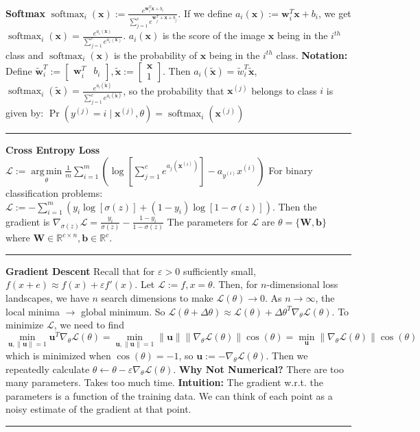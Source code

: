 \documentclass{article}
\newcommand{\R}{\mathbb{R}}
\newcommand{\x}{\bf{x}}
\newcommand{\w}{\bf{w}}
\renewcommand{\u}{\bf{u}}
\renewcommand{\b}{\bf{b}}
\newcommand{\W}{\bf{W}}
\newcommand{\ot}{\leftarrow}
\renewcommand{\bf}[1]{\textbf{{#1}}}
\newcommand{\grad}[2]{\nabla_{#1}{#2}}
\newcommand{\eps}{\varepsilon}
\renewcommand{\L}{\mathcal{L}}
\DeclareMathOperator*{\argmin}{arg\,min}
\DeclareMathOperator*{\sm}{softmax}
\begin{document}
\begin{small}
\newpage
\bf{Softmax}
\newline
$\sm_{i} (\x) := \frac{e^{\w_i^T \x + b_i}}{\sum_{j = 1}^{c} e^{\w_j^T + \x + b_j}}$. If we define
$a_i (\x) := \w_i^T \x + b_i$, we get $\sm_i (\x) = \frac{e^{a_i (\x)}}{\sum_{j = 1}^{c} e^{a_i (\x)}}$.
$a_i (\x)$ is the score of the image $\x$ being in the $i^{th}$ class and $\sm_{i} (\x)$ is the
probability of $\x$ being in the $i^{th}$ class.
\vspace{-0.5em}
\newline
\bf{Notation:} Define 
$
\widetilde{\w}_i^T := 
\begin{bmatrix}
    \w_i^T & b_i
\end{bmatrix}
,
\widetilde{\x} := 
\begin{bmatrix}
    \x \\ 1
\end{bmatrix}
$. Then $a_i (\widetilde{\x}) = \widetilde{w}_i^T \widetilde{\x}$, 
$\sm_i (\widetilde{\x}) = \frac{e^{a_i (\widetilde{\x})}}{\sum_{j = 1}^{c} e^{a_i (\widetilde{\x})}}$,
so the probability that $\x^{(j)}$ belongs to class $i$ is given by:
$\Pr(y^{(j)} = i \mid \x^{(j)}, \theta) = \sm_{i} (\x^{(j)})$
\hrule
\vspace{0.1em}

\bf{Cross Entropy Loss}
\newline
$
\L 
:= \argmin\limits_{\theta} 
\frac{1}{m} \sum\limits_{i = 1}^{m} 
\left( \log \left[ \sum\limits_{j = 1}^{c} e^{a_j (\x^{(i)})} \right] - a_{y^{(i)}} x^{(i)} \right)
$
\newline
For binary classification problems:
$\L := - \sum\limits_{i = 1}^{m} (y_i \log[\sigma(z)] + (1 - y_i)\log[1 - \sigma(z)])$.
Then the gradient is
$\grad{\sigma(z)}{\L} = \frac{y_i}{\sigma(z)} - \frac{1 - y_i}{1 - \sigma(z)}$
The parameters for $\L$ are $\theta = \{\W, \b\}$ where $\W \in \R^{c \times n}, \b \in \R^c$.
\hrule
\vspace{0.1em}
\bf{Gradient Descent}
\newline
Recall that for $\eps > 0$ sufficiently small, $f(x + e) \approx f(x) + \eps f'(x)$. Let
$\L := f, x = \theta$. Then, for $n$-dimensional loss landscapes, we have $n$ search
dimensions to make $\L(\theta) \to 0$. As $n \to \infty$, the local minima $\to$ global
minimum. So 
$
\L(\theta + \Delta \theta) 
\approx 
\L(\theta) + \Delta \theta^T \grad{\theta}{\L(\theta)}
$. To minimize $\L$, we need to find 
$
\min\limits_{\u, \|\u\| = 1} \u^T \grad{\theta}{\L(\theta)}
=
\min\limits_{\u, \|\u\| = 1} \|\u\| \|\grad{\theta}{\L(\theta)}\| \cos(\theta)
=
\min\limits_{\u} \|\grad{\theta}{\L(\theta)}\| \cos(\theta)
$ which is minimized when $\cos(\theta) = -1$, so $\u := -\grad{\theta}{\L(\theta)}$. Then we
repeatedly calculate $\theta \ot \theta - \eps \grad{\theta}{\L(\theta)}$. 
\newline
\bf{Why Not Numerical?} There are too many parameters. Takes too much time.
\newline
\bf{Intuition:}
The gradient w.r.t. the parameters is a function of the training data. We can think of each point as
a noisy estimate of the gradient at that point.
\hrule
\vspace{0.1em}


\end{small}
\end{document}
